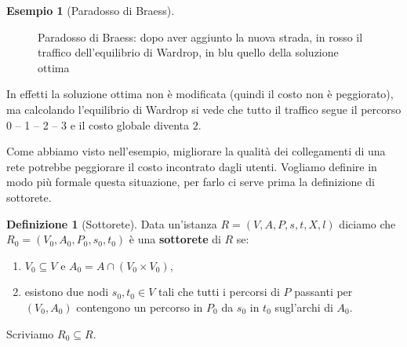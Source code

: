 \documentclass[a4paper]{article}
\theoremstyle{plain}
\theoremstyle{definition}
\newtheorem{mydef}[myteo]{Definizione}
\newtheorem{myes}[myteo]{Esempio}
\theoremstyle{remark}
\newcommand{\pa}[1]{\left(#1\right)}
\begin{document}
\begin{myes}[Paradosso di Braess{\cite[pag. 263]{braess1968}}]
  \begin{figure}[ht]
    \centering

    \caption{Paradosso di Braess: dopo aver aggiunto la nuova strada,
      in rosso il traffico dell'equilibrio di Wardrop, in blu quello
      della soluzione ottima}
    \label{fig:braess-dopo}
  \end{figure}

  In effetti la soluzione ottima non è modificata (quindi il costo non
  è peggiorato), ma calcolando l'equilibrio di Wardrop si vede che
  tutto il traffico segue il percorso 0 -- 1 -- 2 -- 3 e il costo
  globale diventa $2$.
\end{myes}

Come abbiamo visto nell'esempio, migliorare la qualità dei
collegamenti di una rete potrebbe peggiorare il costo incontrato dagli
utenti. Vogliamo definire in modo più formale questa situazione, per
farlo ci serve prima la definizione di sottorete.

\begin{mydef}[Sottorete]
\label{def:sottorete}
  Data un'istanza $R=(V,A,P,s,t,X,l)$ diciamo che
  $R_0=(V_0,A_0,P_0,s_0,t_0)$ è una \textbf{sottorete} di $R$ se:
  \begin{enumerate}
  \item $V_0 \subseteq V$ e $A_0 = A \cap \pa{V_0\times V_0}$,
  \item esistono due nodi $s_0,t_0\in V$ tali che tutti i percorsi di
    $P$ passanti per $\pa{V_0,A_0}$ contengono un percorso in $P_0$ da
    $s_0$ in $t_0$ sugl'archi di $A_0$.
  \end{enumerate}
  Scriviamo $R_0\subseteq R$.
\end{mydef}
\end{document}
